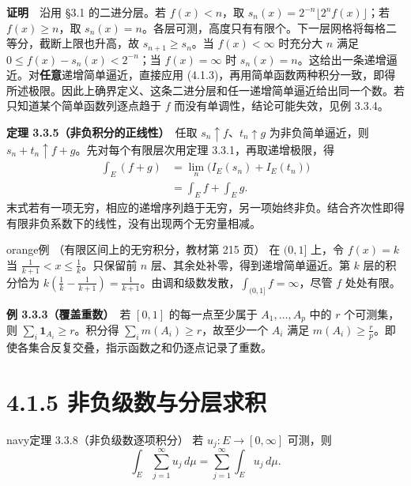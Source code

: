 \documentclass[11pt,a4paper]{article}
\begin{document}
\textbf{证明}　沿用 §3.1 的二进分层。若 \(f(x)<n\)，取
\(s_n(x)=2^{-n}\lfloor 2^n f(x)\rfloor\)；若 \(f(x)\ge n\)，取
\(s_n(x)=n\)。各层可测，高度只有有限个。下一层网格将每格二等分，截断上限也升高，故
\(s_{n+1}\ge s_n\)。当 \(f(x)<\infty\) 时充分大 \(n\) 满足
\(0\le f(x)-s_n(x)<2^{-n}\)；当 \(f(x)=\infty\) 时
\(s_n(x)=n\)。这给出一条递增逼近。对\textbf{任意}递增简单逼近，直接应用
(4.1.3)，再用简单函数两种积分一致，即得所述极限。因此上确界定义、这条二进分层和任一递增简单逼近给出同一个数。若只知道某个简单函数列逐点趋于
\(f\) 而没有单调性，结论可能失效，见例 3.3.4。

\textbf{定理 3.3.5（非负积分的正线性）}　任取
\(s_n\uparrow f\)、\(t_n\uparrow g\) 为非负简单逼近，则
\(s_n+t_n\uparrow f+g\)。先对每个有限层次用定理 3.3.1，再取递增极限，得
\begin{equation*}
\begin{aligned}
\int_E(f+g)
 &=\lim_n\bigl(I_E(s_n)+I_E(t_n)\bigr)\\
 &=\int_E f+\int_E g .
\end{aligned}
\end{equation*}
末式若有一项无穷，相应的递增序列趋于无穷，另一项始终非负。结合齐次性即得有限非负系数下的线性，没有出现两个无穷量相减。

\begin{sboxenv}{orange}{例 （有限区间上的无穷积分，教材第 215 页）}
在 \((0,1]\) 上，令 \(f(x)=k\) 当 \(\frac1{k+1}<x\le\frac1k\)。只保留前
\(n\) 层、其余处补零，得到递增简单逼近。第 \(k\) 层的积分恰为
\(k(\frac1k-\frac1{k+1})=\frac1{k+1}\)。由调和级数发散，\(\int_{(0,1]}f=\infty\)，尽管
\(f\) 处处有限。

\end{sboxenv}

\textbf{例 3.3.3（覆盖重数）}　若 \([0,1]\) 的每一点至少属于
\(A_1,\ldots,A_p\) 中的 \(r\) 个可测集，则
\(\sum_i\mathbf1_{A_i}\ge r\)。积分得 \(\sum_i m(A_i)\ge r\)，故至少一个
\(A_i\) 满足
\(m(A_i)\ge \frac rp\)。即使各集合反复交叠，指示函数之和仍逐点记录了重数。

\clearpage\section[\S{}4.1.5
非负级数与分层求积]{4.1.5
非负级数与分层求积}\label{ux975eux8d1fux7ea7ux6570ux4e0eux5206ux5c42ux6c42ux79ef}

\begin{sboxenv}{navy}{定理 3.3.8（非负级数逐项积分）}
若 \(u_j:E\to[0,\infty]\) 可测，则 \begin{equation*}
\int_E\sum_{j=1}^\infty u_j\,d\mu=\sum_{j=1}^\infty\int_Eu_j\,d\mu .\tag{4.1.4}
\end{equation*}

\end{sboxenv}
\end{document}
